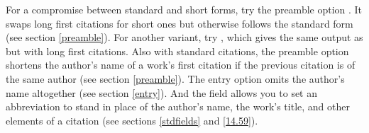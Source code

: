 \documentclass[11pt,letterpaper,oneside]{article}
\begin{document}

\begin{citenobib}
\item \cite[3]{morrison2004a}
\item \cite[18]{morrison2004a}
\item \cite[18]{morrison2004a}
\item \cite[24--26]{morrison2004a}
\item \cite[401-2]{morrison2004b}
\item \cite[433]{morrison2004b}
\item \cite[37--38]{diaz2007}
\item \cite[403]{morrison2004b}
\item \cite[152]{diaz2007}
\item \cite[201-2]{diaz2007}
\item \cites[240]{morrison2004b}[32]{morrison2004a}
\item \cite[33]{morrison2004a}
\end{citenobib}

For a compromise between standard and short forms, try the  preamble
option . It swaps long first citations for short ones
but otherwise follows the standard form (see section \ref{preamble}).
For another variant, try , which gives the same output
as  but with long first citations. Also with standard
citations, the preamble option  shortens the author's
name of a work's first citation if the previous citation is of the
same author (see section \ref{preamble}). The entry option
 omits the author's name altogether (see section
\ref{entry}). And the  field allows you to set an
abbreviation to stand in place of the author's name, the work's title,
and other elements of a citation (see sections \ref{stdfields} and
\ref{14.59}).
\end{document}
